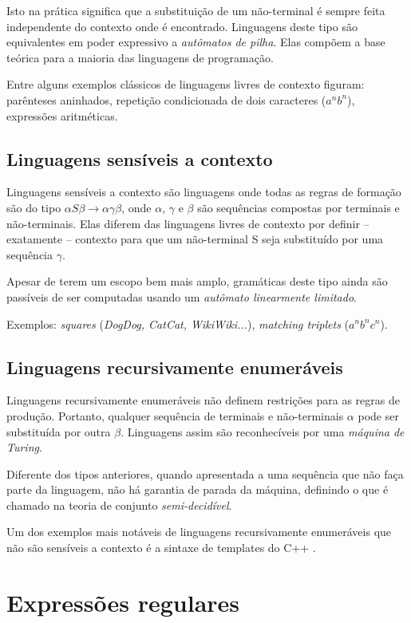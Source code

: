 \documentclass[a4paper,12pt,oneside,onecolumn]{uerj}
\begin{document}
Isto na prática significa que a substituição de um não-terminal é sempre feita independente do contexto onde é encontrado. Linguagens deste tipo são equivalentes em poder expressivo a \emph{autômatos de pilha}. Elas compõem a base teórica para a maioria das linguagens de programação. 

Entre alguns exemplos clássicos de linguagens livres de contexto figuram: parênteses aninhados, repetição condicionada de dois caracteres ($a^nb^n$), expressões aritméticas.

\subsection{Linguagens sensíveis a contexto}
Linguagens sensíveis a contexto são linguagens onde todas as regras de formação são do tipo $\alpha S\beta\rightarrow \alpha\gamma\beta$, onde $\alpha$, $\gamma$ e $\beta$ são sequências compostas por terminais e não-terminais. Elas diferem das linguagens livres de contexto por definir -- exatamente -- contexto para que um não-terminal S seja substituído por uma sequência $\gamma$. 

Apesar de terem um escopo bem mais amplo, gramáticas deste tipo ainda são passíveis de ser computadas usando um \emph{autômato linearmente limitado}. 

Exemplos: \emph{squares} (\emph{DogDog, CatCat, WikiWiki...}), \emph{matching triplets} ($a^nb^nc^n$).

\subsection{Linguagens recursivamente enumeráveis}

Linguagens recursivamente enumeráveis não definem restrições para as regras de produção. Portanto, qualquer sequência de terminais e não-terminais $\alpha$ pode ser substituída por outra $\beta$. Linguagens assim são reconhecíveis por uma \emph{máquina de Turing}. 

Diferente dos tipos anteriores, quando apresentada a uma sequência que não faça parte da linguagem, não há garantia de parada da máquina, definindo o que é chamado na teoria de conjunto \emph{semi-decidível}.

Um dos exemplos mais notáveis de linguagens recursivamente enumeráveis que não são sensíveis a contexto é a sintaxe de templates do C++ \cite{bib:Veldhuizen03}.

\section{Expressões regulares}
\end{document}

